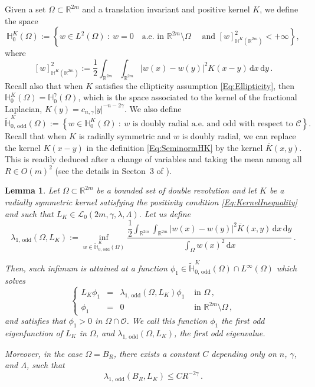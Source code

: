 \documentclass[12pt,reqno]{amsart}
\newtheorem{lemma}[theorem]{Lemma}
\theoremstyle{definition}
\theoremstyle{remark}
\newcommand{\con}[1]{\mathbb{#1}}
\newcommand{\R}{\con{R}} %
\renewcommand{\H}{\con{H}}
\newcommand{\ccal}{\mathscr{C}}
\newcommand{\lcal}{\mathcal{L}}
\newcommand{\ocal}{\mathcal{O}}
\newcommand{\s}{\gamma}
\renewcommand{\d}{\,\mathrm{d}} %
\newcommand{\setcond}[2]{\left \{ #1 \ : \ #2  \right \}}
\newcommand\beqc[1]{\left\{\begin{array}{#1}}
\newcommand\eeqc{\end{array} \right.}
\def\PDEsystem{rcll}
\def\ds{\displaystyle}
\numberwithin{equation}{section}
\begin{document}
Given a set $\Omega \subset \R^{2m}$ and a translation invariant and positive kernel $K$, we define the space
$$
\H^K_0(\Omega) := \setcond{w \in L^2(\Omega)}{w = 0 \quad \textrm{a.e. in } \R^{2m} \setminus \Omega \quad \textrm{ and } [w]^2_{\H^K(\R^{2m})} < + \infty},
$$
where
\begin{equation}
\label{Eq:SeminormHK}
[w]^2_{\H^K(\R^{2m})} := \dfrac{1}{2}\int_{\R^{2m}} \int_{\R^{2m}} |w(x) - w(y)|^2 K(x-y) \d x \d y\,.
\end{equation}
Recall also that when $K$ satisfies the ellipticity assumption \eqref{Eq:Ellipticity}, then $\H^K_0 (\Omega) = \H^\s_0 (\Omega)$, which is the space associated to the kernel of the fractional Laplacian, $K(y) = c_{n,\s}|y|^{-n-2\s}$. We also define
$$
\widetilde{\H}^K_{0, \, \mathrm{odd}}(\Omega) := \setcond{w \in \H^K_0(\Omega)}{w \textrm{ is doubly radial a.e. and odd with respect to } \ccal}.
$$
Recall that when $K$ is radially symmetric and $w$ is doubly radial, we can replace the kernel $K(x-y)$ in the definition \eqref{Eq:SeminormHK} by the kernel $\overline{K}(x,y)$. This is readily deduced after a change of variables and taking the mean among all $R\in O(m)^2$ (see the details in Secton~3 of \cite{FelipeSanz-Perela:IntegroDifferentialI}).




\begin{lemma}
	\label{Lemma:FirstOddEigenfunction}
	Let $\Omega\subset \R^{2m} $ be a bounded set of double revolution and let  $K$ be a radially symmetric kernel satisfying the positivity condition \eqref{Eq:KernelInequality} and such that $L_K\in \lcal_0(2m, \s, \lambda, \Lambda)$. Let us define 
	$$
	\lambda_{1, \, \mathrm{odd}}(\Omega, L_K) := \inf_{w \in \widetilde{\H}^K_{0, \, \mathrm{odd}}(\Omega)} \dfrac{\dfrac{1}{2}  \ds\int_{\R^{2m}} \int_{\R^{2m}} |w(x) - w(y)|^2 \overline{K}(x,y) \d x \d y}{ \ds \int_\Omega w(x)^2 \d x}\,.
	$$
	
	Then, such infimum is attained at a function $\phi_1\in \widetilde{\H}^K_{0, \, \mathrm{odd}}(\Omega)\cap L^\infty(\Omega)$ which solves
	$$
	\beqc{\PDEsystem}
	L_K \phi_1 &=& \lambda_{1, \, \mathrm{odd}}(\Omega, L_K) \phi_1 & \textrm{ in } \Omega\,,\\
	\phi_1 & = & 0 & \textrm{ in } \R^{2m}\setminus \Omega\,,
	\eeqc
	$$
	and satisfies that $\phi_1 > 0$ in $\Omega \cap \ocal$.	We call this function $\phi_1$ the \emph{first odd eigenfunction of $L_K$ in $\Omega$}, and $\lambda_{1, \, \mathrm{odd}}(\Omega, L_K) $, the \emph{first odd eigenvalue}. 
	
	Moreover, in the case $\Omega = B_R$, there exists a constant $C$ depending only on $n$, $\s$, and $\Lambda$, such that
	$$
	\lambda_{1, \, \mathrm{odd}}(B_R, L_K) \leq C R^{-2\s}\,. 
	$$ 
\end{lemma}
\end{document}
